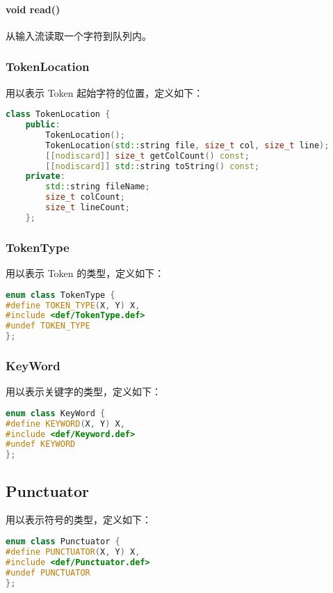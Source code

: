 \documentclass[blue,normal,cn]{elegantnote}
\begin{document}
\paragraph{void read()}
从输入流读取一个字符到队列内。

\subsubsection{TokenLocation}

用以表示 Token 起始字符的位置，定义如下：

\begin{lstlisting}[language=C++]
class TokenLocation {
    public:
        TokenLocation();
        TokenLocation(std::string file, size_t col, size_t line);
        [[nodiscard]] size_t getColCount() const;
        [[nodiscard]] std::string toString() const;
    private:
        std::string fileName;
        size_t colCount;
        size_t lineCount;
    };
\end{lstlisting}

\subsubsection{TokenType}

用以表示 Token 的类型，定义如下：

\begin{lstlisting}[language=C++]
enum class TokenType {
#define TOKEN_TYPE(X, Y) X,
#include <def/TokenType.def>
#undef TOKEN_TYPE
};
\end{lstlisting}

\subsubsection{KeyWord}

用以表示关键字的类型，定义如下：

\begin{lstlisting}[language=C++]
enum class KeyWord {
#define KEYWORD(X, Y) X,
#include <def/Keyword.def>
#undef KEYWORD
};
\end{lstlisting}

\subsection{Punctuator}

用以表示符号的类型，定义如下：

\begin{lstlisting}[language=C++]
enum class Punctuator {
#define PUNCTUATOR(X, Y) X,
#include <def/Punctuator.def>
#undef PUNCTUATOR
};
\end{lstlisting}
\end{document}
